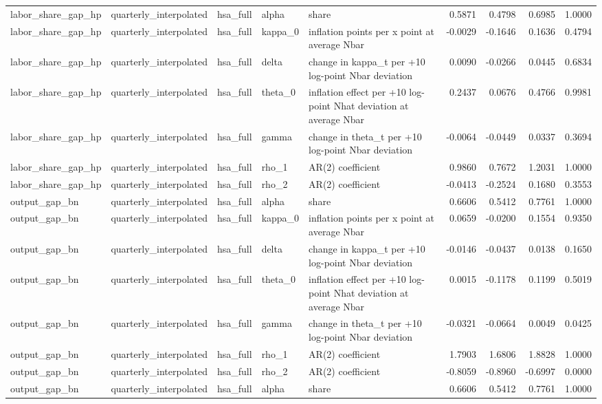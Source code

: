 \begin{tabular}{lllllrrrr}
labor\_share\_gap\_hp & quarterly\_interpolated & hsa\_full & alpha & share & 0.5871 & 0.4798 & 0.6985 & 1.0000 \\
labor\_share\_gap\_hp & quarterly\_interpolated & hsa\_full & kappa\_0 & inflation points per x point at average Nbar & -0.0029 & -0.1646 & 0.1636 & 0.4794 \\
labor\_share\_gap\_hp & quarterly\_interpolated & hsa\_full & delta & change in kappa\_t per +10 log-point Nbar deviation & 0.0090 & -0.0266 & 0.0445 & 0.6834 \\
labor\_share\_gap\_hp & quarterly\_interpolated & hsa\_full & theta\_0 & inflation effect per +10 log-point Nhat deviation at average Nbar & 0.2437 & 0.0676 & 0.4766 & 0.9981 \\
labor\_share\_gap\_hp & quarterly\_interpolated & hsa\_full & gamma & change in theta\_t per +10 log-point Nbar deviation & -0.0064 & -0.0449 & 0.0337 & 0.3694 \\
labor\_share\_gap\_hp & quarterly\_interpolated & hsa\_full & rho\_1 & AR(2) coefficient & 0.9860 & 0.7672 & 1.2031 & 1.0000 \\
labor\_share\_gap\_hp & quarterly\_interpolated & hsa\_full & rho\_2 & AR(2) coefficient & -0.0413 & -0.2524 & 0.1680 & 0.3553 \\
output\_gap\_bn & quarterly\_interpolated & hsa\_full & alpha & share & 0.6606 & 0.5412 & 0.7761 & 1.0000 \\
output\_gap\_bn & quarterly\_interpolated & hsa\_full & kappa\_0 & inflation points per x point at average Nbar & 0.0659 & -0.0200 & 0.1554 & 0.9350 \\
output\_gap\_bn & quarterly\_interpolated & hsa\_full & delta & change in kappa\_t per +10 log-point Nbar deviation & -0.0146 & -0.0437 & 0.0138 & 0.1650 \\
output\_gap\_bn & quarterly\_interpolated & hsa\_full & theta\_0 & inflation effect per +10 log-point Nhat deviation at average Nbar & 0.0015 & -0.1178 & 0.1199 & 0.5019 \\
output\_gap\_bn & quarterly\_interpolated & hsa\_full & gamma & change in theta\_t per +10 log-point Nbar deviation & -0.0321 & -0.0664 & 0.0049 & 0.0425 \\
output\_gap\_bn & quarterly\_interpolated & hsa\_full & rho\_1 & AR(2) coefficient & 1.7903 & 1.6806 & 1.8828 & 1.0000 \\
output\_gap\_bn & quarterly\_interpolated & hsa\_full & rho\_2 & AR(2) coefficient & -0.8059 & -0.8960 & -0.6997 & 0.0000 \\
output\_gap\_bn & quarterly\_interpolated & hsa\_full & alpha & share & 0.6606 & 0.5412 & 0.7761 & 1.0000 \\

\end{tabular}
